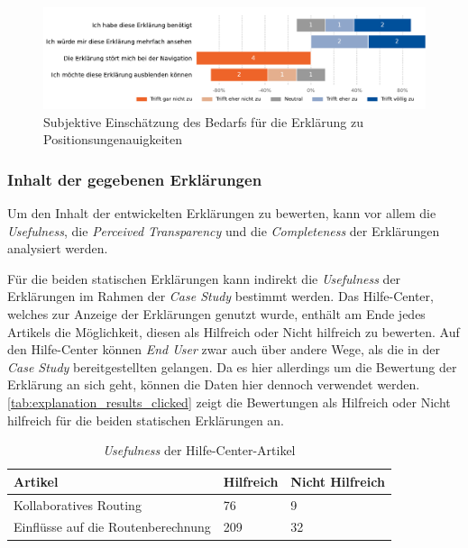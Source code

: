 \begin{figure}[htb!]
    \centering
    \includegraphics[width=\textwidth]{contents/06_model_evaluation/02_evaluation/res/qualitativeFeedback-04_position_accuracy_demand.pdf}
    \caption{Subjektive Einschätzung des Bedarfs für die Erklärung zu Positionsungenauigkeiten}
    \label{fig:04_position_accuracy_demand}
\end{figure}

\subsubsection{Inhalt der gegebenen Erklärungen}

Um den Inhalt der entwickelten Erklärungen zu bewerten, kann vor allem die \textit{Usefulness}, die \textit{Perceived Transparency} und die \textit{Completeness} der Erklärungen analysiert werden.

Für die beiden statischen Erklärungen kann indirekt die \textit{Usefulness} der Erklärungen im Rahmen der \textit{Case Study} bestimmt werden. Das Hilfe-Center, welches zur Anzeige der Erklärungen genutzt wurde, enthält am Ende jedes Artikels die Möglichkeit, diesen als \glqq Hilfreich\grqq{} oder \glqq Nicht hilfreich\grqq{} zu bewerten. Auf den Hilfe-Center können \textit{End User} zwar auch über andere Wege, als die in der \textit{Case Study} bereitgestellten gelangen. Da es hier allerdings um die Bewertung der Erklärung an sich geht, können die Daten hier dennoch verwendet werden. \autoref{tab:explanation_results_clicked} zeigt die Bewertungen als \glqq Hilfreich\grqq{} oder \glqq Nicht hilfreich\grqq{} für die beiden statischen Erklärungen an.

\begin{table}[htb!]
    \centering
    \begin{tabular}{p{}p{}p{}}
        \hline
        Artikel & Hilfreich & Nicht Hilfreich \\
        \toprule
        Kollaboratives Routing & 76 & 9 \\
        Einflüsse auf die Routenberechnung & 209 & 32 \\
        \bottomrule
    \end{tabular}
    \caption{\textit{Usefulness} der Hilfe-Center-Artikel}
    \label{tab:explanation_results_clicked}
\end{table}

